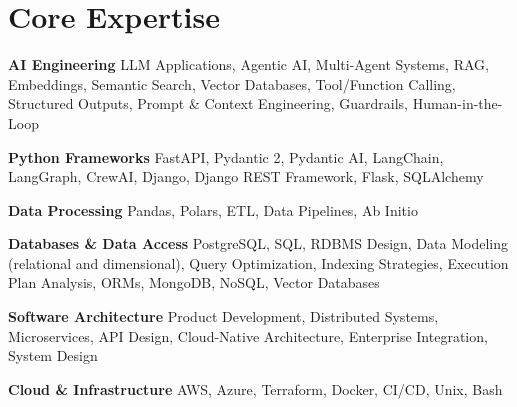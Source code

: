 \documentclass[a4paper]{ThirtyNinesecondscv}
\begin{document}


\makeprofile

\section{Core Expertise}


\textbf{AI Engineering}
\newline
LLM Applications, Agentic AI, Multi-Agent Systems, RAG, Embeddings, Semantic Search, Vector Databases, Tool/Function Calling, Structured Outputs, Prompt \& Context Engineering, Guardrails, Human-in-the-Loop

\textbf{Python Frameworks}
\newline
FastAPI, Pydantic 2, Pydantic AI, LangChain, LangGraph, CrewAI, Django, Django REST Framework, Flask, SQLAlchemy

\textbf{Data Processing}
\newline
Pandas, Polars, ETL, Data Pipelines, Ab Initio

\textbf{Databases \& Data Access}
\newline
PostgreSQL, SQL, RDBMS Design, Data Modeling (relational and dimensional), Query Optimization, Indexing Strategies, Execution Plan Analysis, ORMs, MongoDB, NoSQL, Vector Databases

\textbf{Software Architecture}
\newline
Product Development, Distributed Systems, Microservices, API Design, Cloud-Native Architecture, Enterprise Integration, System Design

\textbf{Cloud \& Infrastructure}
\newline
AWS, Azure, Terraform, Docker, CI/CD, Unix, Bash
\end{document}
